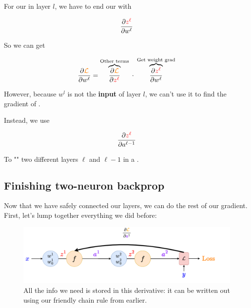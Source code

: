         \begin{concept}
            For our  in layer $l$, we have to end our  with
            
            \begin{equation*}
                \frac{\partial \textcolor{red}{z^\ell}}{\partial w^\ell}
            \end{equation*}
            
            So we can get 
            
            \begin{equation*}
                \frac{\partial \textcolor{orange}{\mathcal{L}}}{\partial w^\ell} 
                =
                \overbrace{
                    \frac{\partial \textcolor{orange}{\mathcal{L}}}{\partial \textcolor{red}{z^\ell}} 
                }^{\text{Other terms} }
                \; \cdot \;  
                \overbrace{
                    \frac{\partial \textcolor{red}{z^\ell}}{\partial w^\ell}
                }^{\text{Get weight grad}}
            \end{equation*}
            
            However, because $w^l$ is not the \textbf{input} of layer $l$, we can't use it to find the gradient of .
            
            Instead, we use 
            
            \begin{equation}
                \frac{\partial \textcolor{red}{z^\ell}}{\partial a^{\ell-1}}
            \end{equation}
            
            To "" two different layers $\ell$ and $\ell-1$ in a .
        \end{concept}
        
            
    \phantom{}
    
    \subsection{Finishing two-neuron backprop}
    
        Now that we have safely connected our layers, we can do the rest of our gradient. First, let's lump together everything we did before:
        
        \begin{figure}[H]
            \centering
            \includegraphics[width=120mm,scale=0.4]{images/nn_2_images/two_neurons_inside_bp4.png}
            \caption*{All the info we need is stored in this derivative: it can be written out using our friendly chain rule from earlier.}
        \end{figure}
        
